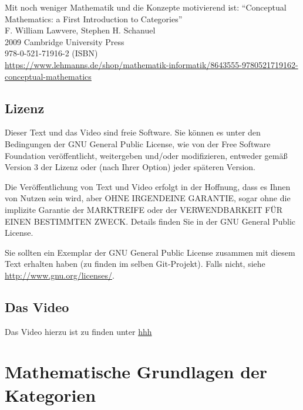 \documentclass[a4paper]{amsart}
\theoremstyle{definition}
\begin{document}
Mit noch weniger Mathematik und die Konzepte motivierend ist:
"`Conceptual Mathematics: a First Introduction to Categories"'\\
F. William Lawvere, Stephen H. Schanuel\\
2009 Cambridge University Press\\
978-0-521-71916-2 (ISBN)\\
{\tiny\url{https://www.lehmanns.de/shop/mathematik-informatik/8643555-9780521719162-conceptual-mathematics}}

\subsection*{Lizenz}
Dieser Text und das Video sind freie Software. Sie können es unter den Bedingungen der
GNU General Public License, wie von der Free Software Foundation veröffentlicht, weitergeben
und/oder modifizieren, entweder gemäß Version 3 der Lizenz oder (nach Ihrer Option) jeder späteren Version.

Die Veröffentlichung von Text und Video erfolgt in der Hoffnung, dass es Ihnen von Nutzen sein wird,
aber OHNE IRGENDEINE GARANTIE, sogar ohne die implizite Garantie der MARKTREIFE oder der
VERWENDBARKEIT FÜR EINEN BESTIMMTEN ZWECK. Details finden Sie in der GNU General Public License.

Sie sollten ein Exemplar der GNU General Public License zusammen mit diesem Text erhalten haben
(zu finden im selben Git-Projekt).
Falls nicht, siehe \url{http://www.gnu.org/licenses/}.

\subsection*{Das Video}
Das Video hierzu ist zu finden unter
{\tiny
   \url{hhh}
}

\section{Mathematische Grundlagen der Kategorien}
\end{document}
